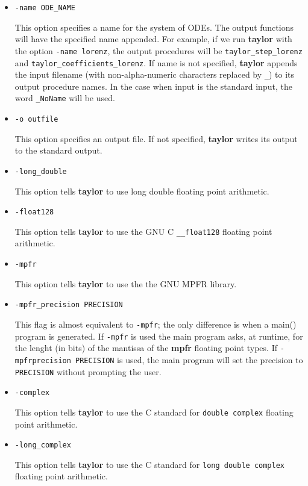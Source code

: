 \documentclass[10pt]{article}
\theoremstyle{remark}
\newcommand{\taylorname}{{\bf taylor}}
\begin{document}
\begin{itemize}
\item{ \verb+-name ODE_NAME+ 

This option specifies a name for the system of ODEs. The output
functions will have the specified name appended. For example, if we
run \taylorname{} with the option \verb+-name lorenz+, the output
procedures will be \verb+taylor_step_lorenz+ and
\verb+taylor_coefficients_lorenz+.  If name is not specified,
\taylorname{} appends the input filename (with non-alpha-numeric
characters replaced by \verb+_+) to its output procedure names. In the
case when input is the standard input, the word \verb+_NoName+ will be
used.}
\item{ \verb+-o outfile+ 

This option specifies an output file. If not specified, \taylorname{}
writes its output to the standard output.}

\noindent

\item{\verb+-long_double+

This option tells \taylorname{} to use long double
floating point arithmetic.  }

\item{\verb+-float128+

This option tells \taylorname{} to use the GNU C \verb+__float128+
floating point arithmetic.  }

\item{\verb+-mpfr+ 

This option tells \taylorname{} to use the the GNU MPFR library.  }

\item{\verb+-mpfr_precision PRECISION+

This flag is almost equivalent to {\tt -mpfr}; the only difference is
when a main() program is generated. If {\tt -mpfr} is used the main
program asks, at runtime, for the lenght (in bits) of the mantissa of
the {\bf mpfr} floating point types. If {\tt -mpfrprecision
  PRECISION} is used, the main program will set the precision to {\tt
  PRECISION} without prompting the user.}


\item{\verb+-complex+

This option tells \taylorname{} to use the C standard for \verb+double complex+
floating point arithmetic.  }

\item{\verb+-long_complex+

This option tells \taylorname{} to use the C standard for
\verb+long double complex+ floating point arithmetic.  }


\end{itemize}
\end{document}
